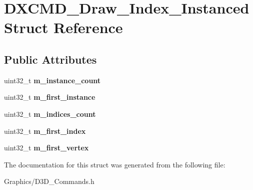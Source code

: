\hypertarget{structDXCMD__Draw__Index__Instanced}{}\section{D\+X\+C\+M\+D\+\_\+\+Draw\+\_\+\+Index\+\_\+\+Instanced Struct Reference}
\label{structDXCMD__Draw__Index__Instanced}
\subsection*{Public Attributes}
\begin{DoxyCompactItemize}
\item 
\mbox{\label{structDXCMD__Draw__Index__Instanced_a3db3ea14a0cce142d7e67ab1f7905256}} 
uint32\+\_\+t {\bfseries m\+\_\+instance\+\_\+count}
\item 
\mbox{\label{structDXCMD__Draw__Index__Instanced_a6e48bf5d9ea2d93b4f646e92c18d9c2d}} 
uint32\+\_\+t {\bfseries m\+\_\+first\+\_\+instance}
\item 
\mbox{\label{structDXCMD__Draw__Index__Instanced_a5a2dd896fe20acdc3adc870990594c6e}} 
uint32\+\_\+t {\bfseries m\+\_\+indices\+\_\+count}
\item 
\mbox{\label{structDXCMD__Draw__Index__Instanced_aac378ef0fe2bf0dedd9e44380d9f0f0e}} 
uint32\+\_\+t {\bfseries m\+\_\+first\+\_\+index}
\item 
\mbox{\label{structDXCMD__Draw__Index__Instanced_ac28dc0162286a9ccf82ccca06f56f41d}} 
uint32\+\_\+t {\bfseries m\+\_\+first\+\_\+vertex}
\end{DoxyCompactItemize}


The documentation for this struct was generated from the following file\+:\begin{DoxyCompactItemize}
\item 
Graphics/D3\+D\+\_\+\+Commands.\+h\end{DoxyCompactItemize}
